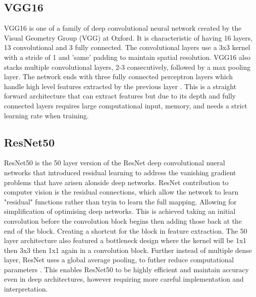 \documentclass[10pt,twocolumn,letterpaper]{article}
\begin{document}
\subsection{VGG16}
VGG16 is one of a family of deep convolutional neural network created by the Visual Geometry Group (VGG) at Oxford. It is characteristic of having 16 layers, 13 convolutional and 3 fully connected. The convolutional layers use a 3x3 kernel with a stride of 1 and 'same' padding to maintain spatial resolution. VGG16 also stacks multiple convolutional layers, 2-3 consecutively, followed by a max pooling layer. The network ends with three fully connected perceptron layers which handle high level features extracted by the previous layer \cite{original_vgg}. This is a straight forward architecture that can extract features but due to its depth and fully connected layers requires large computational input, memory, and needs a strict learning rate when training. 

\subsection{ResNet50}
ResNet50 is the 50 layer version of the ResNet deep convolutional nueral networks that introduced residual learning to address the vanishing gradient problems that have arisen alonside deep networks. ResNet contribution to computer vision is the residual connections, which allow the network to learn "residual" functions rather than tryin to learn the full mapping. Allowing for simplification of optimising deep networks. This is achieved taking an initial convolution before the convolution block begins then adding those back at the end of the block. Creating a shortcut for the block in feature extraction. The 50 layer architecture also featured a bottleneck design where the kernel will be 1x1 then 3x3 then 1x1 again in a convolution block. Further instead of multiple dense layer, ResNet uses a global average pooling, to futher reduce computational parameters \cite{original_resnet} \cite{finetuningresnet50}. This enables ResNet50 to be highly efficient and maintain accuracy even in deep architectures, however requiring more careful implementation and interpretation. 
\end{document}
